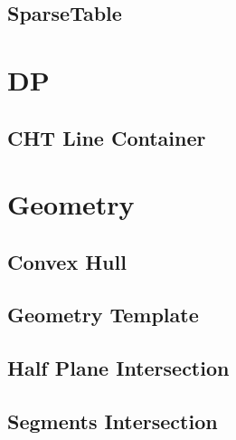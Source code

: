 \subsection{SparseTable}
\vspace{-2ex}
\raggedbottom
\vspace{-3.2ex}
\hrulefill

\section{DP}
\subsection{CHT Line Container}
\vspace{-2ex}
\raggedbottom
\vspace{-3.2ex}
\hrulefill

\section{Geometry}
\subsection{Convex Hull}
\vspace{-2ex}
\raggedbottom
\vspace{-3.2ex}
\hrulefill
\subsection{Geometry Template}
\vspace{-2ex}
\raggedbottom
\vspace{-3.2ex}
\hrulefill
\subsection{Half Plane Intersection}
\vspace{-2ex}
\raggedbottom
\vspace{-3.2ex}
\hrulefill
\subsection{Segments Intersection}
\vspace{-2ex}
\raggedbottom
\vspace{-3.2ex}
\hrulefill
